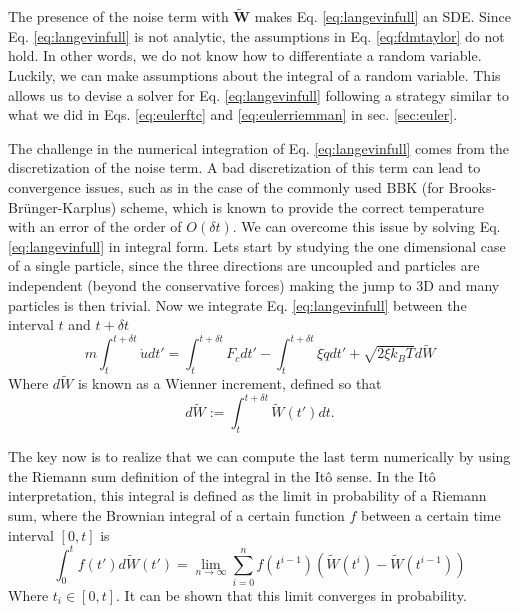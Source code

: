 \documentclass[ twoside,openright,titlepage,numbers=noenddot,%
headinclude,footinclude,cleardoublepage=empty,abstract=on,
BCOR=5mm,paper=b5,fontsize=11pt, dvipsnames
]{scrreprt}
\renewcommand{\vec}[1]{\bm{#1}}
\newcommand{\dt}{\delta t}
\newcommand{\kT}{k_B T}
\newcommand{\noise}{\widetilde{W}}
\newcommand{\ppos}{q}
\newcommand{\pvel}{u}
\begin{document}
The presence of the noise term with $\vec{\widetilde{W}}$ makes Eq. \eqref{eq:langevinfull} an \gls{SDE}. Since Eq. \eqref{eq:langevinfull} is not analytic, the assumptions in Eq. \eqref{eq:fdmtaylor} do not hold. In other words, we do not know how to differentiate a random variable. Luckily, we can make assumptions about the integral of a random variable. This allows us to devise a solver for Eq. \eqref{eq:langevinfull} following a strategy  similar to what we did in Eqs. \eqref{eq:eulerftc} and \eqref{eq:eulerriemman} in sec. \ref{sec:euler}.

The challenge in the numerical integration of Eq. \eqref{eq:langevinfull} comes from the discretization of the noise term.
A bad discretization of this term can lead to convergence issues, such as in the case of the commonly used BBK (for Brooks-Brünger-Karplus) scheme\cite{Brunger1984}, which is known to provide the correct temperature with an error of the order of $O(\dt)$\cite{Wang2003}.
We can overcome this issue by solving Eq. \eqref{eq:langevinfull} in integral form. Lets start by studying the one dimensional case of a single particle, since the three directions are uncoupled and particles are independent (beyond the conservative forces) making the jump to 3D and many particles is then trivial. Now we integrate Eq. \eqref{eq:langevinfull} between the interval $t$ and $t+\dt$
\begin{equation}
  \label{eq:langevinriemann}
  m\int_t^{t+\dt}\dot{\pvel} dt' = \int_t^{t+\dt}F_c dt' - \int_t^{t+\dt}\xi\dot{\ppos}dt' + \sqrt{2\xi\kT}d\noise
\end{equation}
Where $d\noise$ is known as a Wienner increment, defined so that
\begin{equation}
  \label{eq:langevinwiennerinc}
  d\noise := \int_t^{t+\dt}\noise(t') dt.
\end{equation}

The key now is to realize that we can compute the last term numerically by using the Riemann sum definition of the integral in the Itô sense.
In the Itô interpretation, this integral is defined as the limit in probability of a Riemann sum, where the Brownian integral of a certain function $f$ between a certain time interval $[0, t]$ is
\begin{equation}
  \label{eq:itonoise}
  \int_0^tf(t')d\noise(t') = \lim_{n\rightarrow\infty}\sum_{i=0}^nf(t^{i-1}) (\noise(t^i) - \noise({t^{i-1}}))
\end{equation}
Where $t_i\in [0, t]$.
It can be shown that this limit converges in probability\cite{Cohen2015}.
\end{document}
